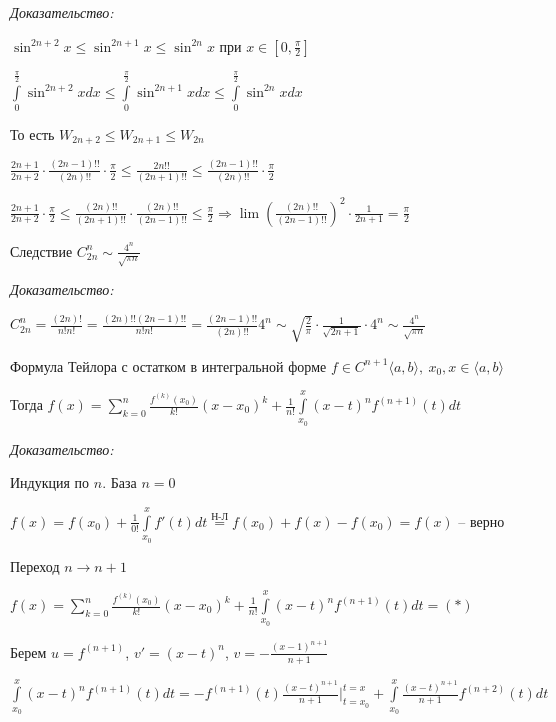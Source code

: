 \documentclass[12pt]{article}
\newcommand{\q}[1]{\langle #1 \rangle}
\begin{document}
\textit{Доказательство:}

$\sin^{2n + 2}x \leq \sin^{2n + 1}x \leq \sin^{2n}x$ при $x \in [0, \frac{\pi}{2}]$

$\int\limits_0^\frac{\pi}{2} \sin^{2n + 2}x dx \leq \int\limits_0^\frac{\pi}{2} \sin^{2n + 1}x dx \leq \int\limits_0^\frac{\pi}{2} \sin^{2n}x dx$

То есть $W_{2n + 2} \leq W_{2n + 1} \leq W_{2n}$

$\frac{2n + 1}{2n + 2} \cdot \frac{(2n - 1)!!}{(2n)!!} \cdot \frac{\pi}{2} \leq \frac{2n!!}{(2n + 1)!!} \leq \frac{(2n - 1)!!}{(2n)!!} \cdot \frac{\pi}{2}$

$\frac{2n + 1}{2n + 2} \cdot \frac{\pi}{2} \leq \frac{(2n)!!}{(2n + 1)!!} \cdot \frac{(2n)!!}{(2n - 1)!!} \leq \frac{\pi}{2} \Rightarrow \lim (\frac{(2n)!!}{(2n - 1)!!})^2 \cdot \frac{1}{2n + 1} = \frac{\pi}{2}$

\begin{theo}{Следствие}
    $C_{2n}^n \sim \frac{4^n}{\sqrt{\pi n}}$
\end{theo}

\textit{Доказательство:}

$C_{2n}^n = \frac{(2n)!}{n!n!} = \frac{(2n)!!(2n-1)!!}{n!n!} = \frac{(2n - 1)!!}{(2n)!!} 4^n \sim \sqrt{\frac{2}{\pi}} \cdot \frac{1}{\sqrt{2n + 1}} \cdot 4^n \sim \frac{4^n}{\sqrt{\pi n}}$

\begin{theo}{Формула Тейлора с остатком в интегральной форме}
    $f \in C^{n+1}\q{a, b},\ x_0, x \in \q{a, b}$

    Тогда $f(x) = \sum\limits_{k = 0}^n \frac{f^{(k)}(x_0)}{k!}(x - x_0)^k + \frac{1}{n!} \int\limits_{x_0}^x (x - t)^n f^{(n+1)}(t)dt$
\end{theo}

\textit{Доказательство:}

Индукция по $n$. База $n = 0$

$f(x) = f(x_0) + \frac{1}{0!} \int\limits_{x_0}^x f'(t)dt \stackrel{\text{Н-Л}}{=} f(x_0) + f(x) - f(x_0) = f(x)$ -- верно

Переход $n \to n + 1$

$f(x) = \sum\limits_{k = 0}^n \frac{f^{(k)}(x_0)}{k!}(x - x_0)^k + \frac{1}{n!} \int\limits_{x_0}^x (x - t)^n f^{(n+1)}(t)dt = (*)$

Берем $u = f^{(n + 1)}$, $v' = (x - t)^n$, $v = -\frac{(x - 1)^{n + 1}}{n + 1}$

$\int\limits_{x_0}^x (x-t)^n f^{(n + 1)}(t)dt = -f^{(n + 1)}(t) \frac{(x - t)^{n + 1}}{n + 1}|_{t = x_0}^{t = x} + \int\limits_{x_0}^x \frac{(x - t)^{n + 1}}{n + 1} f^{(n + 2)}(t)dt$
\end{document}
